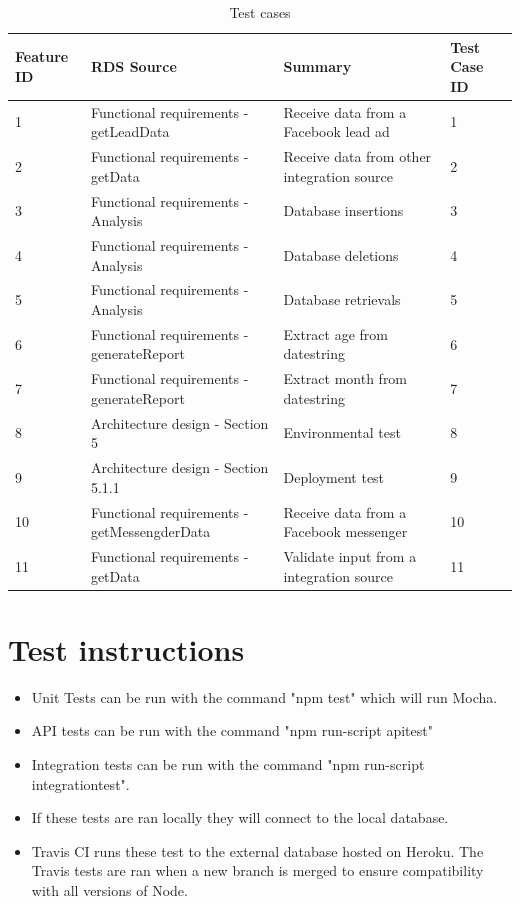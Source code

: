 \documentclass{article}
\begin{document}
\begin{table}[H]
\centering
\caption{Test cases}
\label{test_table}
\begin{tabular}{|l|l|l|l|}
\hline
Feature ID & RDS Source                            & Summary                                    & Test Case ID \\ \hline \hline
1          & Functional requirements - getLeadData & Receive data from a Facebook lead ad       & 1            \\ \hline
2          & Functional requirements - getData     & Receive data from other integration source & 2            \\ \hline
3          & Functional requirements - Analysis    & Database insertions                        & 3            \\ \hline
4          & Functional requirements - Analysis    & Database deletions                         & 4            \\ \hline
5          & Functional requirements - Analysis    & Database retrievals                        & 5            \\ \hline
6          & Functional requirements - generateReport & Extract age from datestring			    & 6			   \\ \hline
7	       & Functional requirements - generateReport & Extract month from datestring			& 7            \\ \hline
8          &  Architecture design - Section 5      & Environmental test                         & 8            \\ \hline
9          &  Architecture design - Section 5.1.1  & Deployment test                            & 9            \\ \hline
10         &  Functional requirements - getMessengderData & Receive data from a Facebook messenger & 10            \\ \hline
11        &  Functional requirements - getData & Validate input from a integration source & 11         \\ \hline
\end{tabular}
\end{table}


\section{Test instructions} 
\begin{itemize}
\item Unit Tests can be run with the command "npm test" which will run Mocha.
\item API tests can be run with the command "npm run-script apitest"
\item Integration tests can be run with the command "npm run-script integrationtest".  
\item If these tests are ran locally they will connect to the local database.
\item Travis CI runs these test to the external database hosted on Heroku. The Travis tests are ran when a new branch is merged to ensure compatibility with all versions of Node.
\end{itemize}
\cleardoublepage
\end{document}
